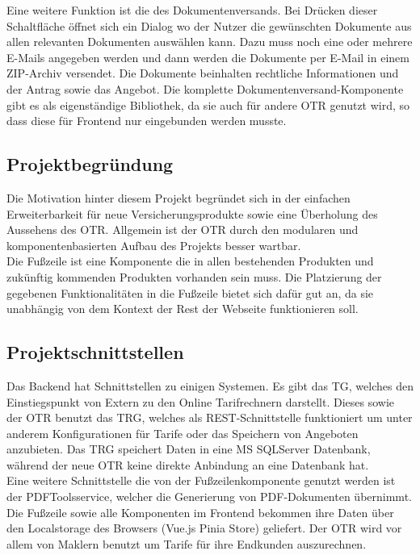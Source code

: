 Eine weitere Funktion ist die des Dokumentenversands. Bei Drücken dieser Schaltfläche öffnet sich ein Dialog wo der Nutzer die gewünschten Dokumente aus allen relevanten Dokumenten auswählen kann. Dazu muss noch eine oder mehrere E-Mails angegeben werden und dann werden die Dokumente per E-Mail in einem ZIP-Archiv versendet. Die Dokumente beinhalten rechtliche Informationen und der Antrag sowie das Angebot. Die komplette Dokumentenversand-Komponente gibt es als eigenständige Bibliothek, da sie auch für andere \ac{OTR} genutzt wird, so dass diese für Frontend nur eingebunden werden musste.

\subsection{Projektbegründung}
\label{projektbegründung}
Die Motivation hinter diesem Projekt begründet sich in der einfachen Erweiterbarkeit für neue Versicherungsprodukte sowie eine Überholung des Aussehens des \ac{OTR}. Allgemein ist der \ac{OTR} durch den modularen und komponentenbasierten Aufbau des Projekts besser wartbar. \\
Die Fußzeile ist eine Komponente die in allen bestehenden Produkten und zukünftig kommenden Produkten vorhanden sein muss. Die Platzierung der gegebenen Funktionalitäten in die Fußzeile bietet sich dafür gut an, da sie unabhängig von dem Kontext der Rest der Webseite funktionieren soll.
\subsection{Projektschnittstellen}
\label{projektschnittstellen}
Das Backend hat %
Schnittstellen zu einigen Systemen. Es gibt das \ac{TG}, welches den Einstiegspunkt von Extern zu den Online Tarifrechnern darstellt. Dieses sowie der \ac{OTR} benutzt das \ac{TRG}, welches als REST-Schnittstelle funktioniert um unter anderem Konfigurationen für Tarife oder das Speichern von Angeboten anzubieten. Das \ac{TRG} speichert Daten in eine MS SQLServer Datenbank, während der neue \ac{OTR} keine direkte Anbindung an eine Datenbank hat. \\ %
Eine weitere Schnittstelle die von der Fußzeilenkomponente genutzt werden ist der PDFToolsservice, welcher die Generierung von PDF-Dokumenten übernimmt. Die Fußzeile sowie alle Komponenten im Frontend bekommen ihre Daten über den Localstorage des Browsers (Vue.js Pinia Store) geliefert.
Der \ac{OTR} wird vor allem von Maklern benutzt um Tarife für ihre Endkunden auszurechnen.
